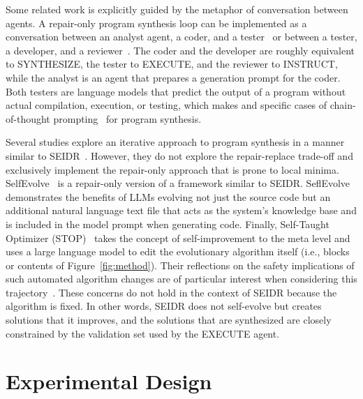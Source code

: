 Some related work is explicitly guided by the metaphor of conversation between agents. 
A repair-only program synthesis loop can be implemented as a conversation between an analyst agent, a coder, and a tester~\cite{zhangSTEAMSimulatingInteractive2023} or between a tester, a developer, and a reviewer~\cite{dongSelfcollaborationCodeGeneration2023}. 
The coder and the developer are roughly equivalent to SYNTHESIZE, the tester to EXECUTE, and the reviewer to INSTRUCT, while the analyst is an agent that prepares a generation prompt for the coder. 
Both testers are language models that predict the output of a program without actual compilation, execution, or testing, which makes \cite{dongSelfcollaborationCodeGeneration2023} and \cite{zhangSTEAMSimulatingInteractive2023} specific cases of chain-of-thought prompting~\cite{yuBetterChainofThoughtPrompting2023} for program synthesis.

Several studies explore an iterative approach to program synthesis in a manner similar to SEIDR~\cite{xiaConversationalAutomatedProgram2023,chenTeachingLargeLanguage2023,shinnReflexionLanguageAgents2023}. 
However, they do not explore the repair-replace trade-off and exclusively implement the repair-only approach that is prone to local minima.
SelfEvolve~\cite{jiangSelfEvolveCodeEvolution2023} is a repair-only version of a framework similar to SEIDR.
SeflEvolve demonstrates the benefits of LLMs evolving not just the source code but an additional natural language text file that acts as the system's knowledge base and is included in the model prompt when generating code. 
Finally, Self-Taught Optimizer (STOP)~\cite{zelikmanSelfTaughtOptimizerSTOP2023} takes the concept of self-improvement to the meta level and uses a large language model to edit the evolutionary algorithm itself (i.e., blocks or contents of Figure~\ref{fig:method}). 
Their reflections on the safety implications of such automated algorithm changes are of particular interest when considering this trajectory~\cite[section 8]{zelikmanSelfTaughtOptimizerSTOP2023}. These concerns do not hold in the context of SEIDR because the algorithm is fixed.
In other words, SEIDR does not self-evolve but creates solutions that it improves, and the solutions that are synthesized are closely constrained by the validation set used by the EXECUTE agent.

\newpage\section{Experimental Design}
\label{sec:seidr-eval}

